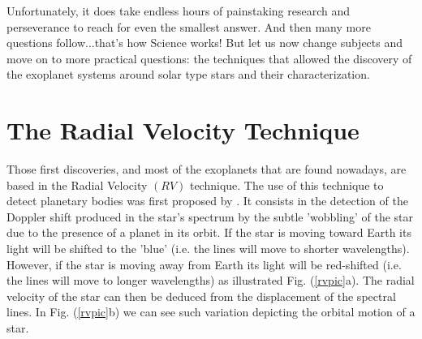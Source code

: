 \documentclass[dvips,12pt,a4paper]{report}
\begin{document}
Unfortunately, it does take endless hours of painstaking research and perseverance to reach for even the smallest answer. And then many more questions follow...that's how Science works! But let us now change subjects and move on to more practical questions: the techniques that allowed the discovery of the exoplanet systems around solar type stars and their characterization.


\section{The Radial Velocity Technique}

Those first discoveries, and most of the exoplanets that are found nowadays, are based in the Radial Velocity $(RV)$ technique. The use of this technique to detect planetary bodies was first proposed by \citet{Struve-1952}. It consists in the detection of the Doppler shift produced in the star's spectrum  by the subtle 'wobbling' of the star due to the presence of a planet in its orbit. If the star is moving toward Earth its light will be shifted to the 'blue' (i.e. the lines will move to shorter wavelengths). However, if the star is moving away from Earth its light will be red-shifted (i.e. the lines will move to longer wavelengths) as illustrated Fig. (\ref{rvpic}a). The radial velocity of the star can then be deduced from the displacement of the spectral lines. 
In Fig. (\ref{rvpic}b) we can see such variation depicting the orbital motion of a star. 
\end{document}
